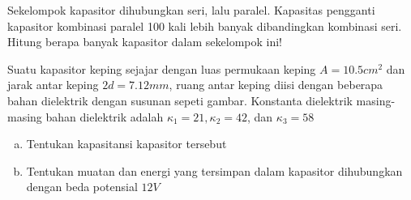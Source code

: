 \begin{enumerate}
     \item Sekelompok kapasitor dihubungkan seri, lalu paralel. Kapasitas pengganti kapasitor kombinasi paralel 100 kali lebih banyak dibandingkan kombinasi seri. Hitung berapa banyak kapasitor dalam sekelompok ini!
     \vskip 10pt
    \begin{minipage}{0.55\textwidth}
    \item Suatu kapasitor keping sejajar dengan luas permukaan keping $A = 10.5 cm^{2}$ dan jarak antar keping $2d=7.12mm$, ruang antar keping diisi dengan beberapa bahan dielektrik dengan susunan sepeti gambar. Konstanta dielektrik masing-masing bahan dielektrik adalah $\kappa_1 =21, \kappa_2 =42$, dan $\kappa_3=58$
        \begin{enumerate}[a)]
            \item Tentukan kapasitansi kapasitor tersebut
            \item Tentukan muatan dan energi yang tersimpan dalam kapasitor dihubungkan dengan beda potensial $12V$
        \end{enumerate}
    \end{minipage}
    \hfill
    \begin{minipage}{0.35\textwidth}
    \end{minipage}
    
     
    \end{enumerate}